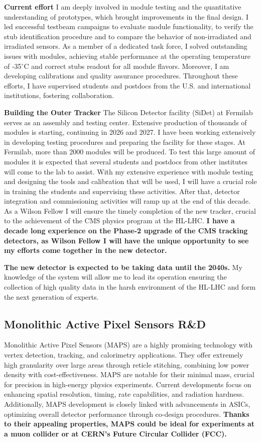 {\begin{flushleft}
\textbf{Current effort}
I am deeply involved in module testing and the quantitative understanding of prototypes, which brought improvements in the final design. I led successful testbeam campaigns to evaluate module functionality, to verify the stub identification procedure and to compare the behavior of non-irradiated and irradiated sensors. As a member of a dedicated task force, I solved outstanding issues with modules, achieving stable performance at the operating temperature of -35$^{\circ}$C and correct stubs readout for all module flavors. Moreover, I am developing calibrations and quality assurance procedures. Throughout these efforts, I have supervised students and postdocs from the U.S. and international institutions, fostering collaboration.

\textbf{Building the Outer Tracker}
The Silicon Detector facility (SiDet) at Fermilab serves as an assembly and testing center. Extensive production of thousands of modules is starting, continuing in 2026 and 2027. I have been working extensively in developing testing procedures and preparing the facility for these stages. At Fermilab, more than 2000 modules will be produced. To test this large amount of modules it is expected that several students and postdocs from other institutes will come to the lab to assist. With my extensive experience with module testing and designing the tools and calibration that will be used, I will have a crucial role in training the students and supervising these activities. 
After that, detector integration and commissioning activities will ramp up at the end of this decade. As a Wilson Fellow I will ensure the timely completion of the new tracker, crucial to the  achievement of the CMS physics program at the HL-LHC.
\textbf{I have a decade long experience on the Phase-2 upgrade of the CMS tracking detectors, as Wilson Fellow I will have the unique opportunity to see my efforts come together in the new detector.} 

{\bf The new detector is expected to be taking data until the 2040s.} My knowledge of the system will allow me to lead its operation ensuring the collection of high quality data in the harsh environment of the HL-LHC and form the next generation of experts.

\subsection{Monolithic Active Pixel Sensors R\&D}
Monolithic Active Pixel Sensors (MAPS) are a highly promising technology with vertex detection, tracking, and calorimetry applications. They offer extremely high granularity over large areas through reticle stitching, combining low power density with cost-effectiveness. MAPS are notable for their minimal mass, crucial for precision in high-energy physics experiments.
Current developments focus on enhancing spatial resolution, timing, rate capabilities, and radiation hardness. Additionally, MAPS development is closely linked with advancements in ASICs, optimizing overall detector performance through co-design procedures. {\bf Thanks to their appealing properties, MAPS could be ideal for experiments at a muon collider or at CERN's Future Circular Collider (FCC).}


\end{flushleft}}
